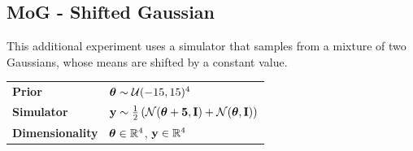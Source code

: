 

\subsection{MoG - Shifted Gaussian}

This additional experiment uses a simulator that samples from a mixture of two Gaussians, whose means are shifted by a constant value.

\begin{tabular}{@{}ll@{}}
  \textbf{Prior} & $\boldsymbol{\theta} \sim \mathcal{U}(-15, 15)^4$ \\[5pt]
  \textbf{Simulator} & $\mathbf{y} \sim \frac{1}{2} \left ( \mathcal{N}(\boldsymbol{\theta} + \mathbf{5}, \mathbf{I}) + \mathcal{N}(\boldsymbol{\theta}, \mathbf{I}) \right )$ \\[5pt]
  \textbf{Dimensionality} & $\boldsymbol{\theta} \in \mathbb{R}^{4}$, $\mathbf{y} \in \mathbb{R}^{4}$ \\[5pt]
\end{tabular}

